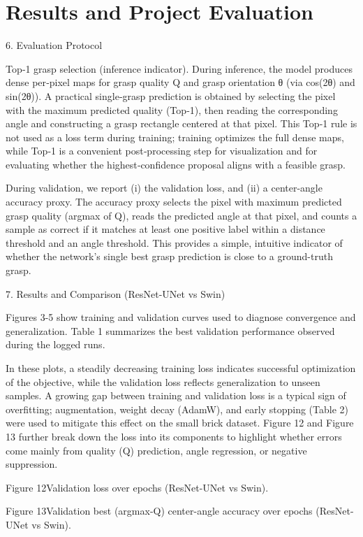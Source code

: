 \chapter{Results and Project Evaluation}
6. Evaluation Protocol

Top‑1 grasp selection (inference indicator). During inference, the model produces dense per‑pixel maps for grasp quality Q and grasp orientation θ (via cos(2θ) and sin(2θ)). A practical single‑grasp prediction is obtained by selecting the pixel with the maximum predicted quality (Top‑1), then reading the corresponding angle and constructing a grasp rectangle centered at that pixel. This Top‑1 rule is not used as a loss term during training; training optimizes the full dense maps, while Top‑1 is a convenient post‑processing step for visualization and for evaluating whether the highest‑confidence proposal aligns with a feasible grasp.

During validation, we report (i) the validation loss, and (ii) a center-angle accuracy proxy. The accuracy proxy selects the pixel with maximum predicted grasp quality (argmax of Q), reads the predicted angle at that pixel, and counts a sample as correct if it matches at least one positive label within a distance threshold and an angle threshold. This provides a simple, intuitive indicator of whether the network’s single best grasp prediction is close to a ground-truth grasp.

7. Results and Comparison (ResNet-UNet vs Swin)

Figures 3-5 show training and validation curves used to diagnose convergence and generalization. Table 1 summarizes the best validation performance observed during the logged runs.

In these plots, a steadily decreasing training loss indicates successful optimization of the objective, while the validation loss reflects generalization to unseen samples. A growing gap between training and validation loss is a typical sign of overfitting; augmentation, weight decay (AdamW), and early stopping (Table 2) were used to mitigate this effect on the small brick dataset. Figure 12 and Figure 13 further break down the loss into its components to highlight whether errors come mainly from quality (Q) prediction, angle regression, or negative suppression.

Figure 12Validation loss over epochs (ResNet-UNet vs Swin).

Figure 13Validation best (argmax-Q) center-angle accuracy over epochs (ResNet-UNet vs Swin).

